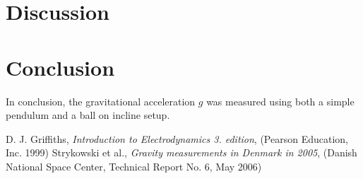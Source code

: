 \documentclass[a4paper,%
aps,%
prl,%
amsfonts,%
amssymb,%
amsmath,%
nobibnotes,%
twocolumn, %
twoside,%
balancelastpage,%
eqsecnum] %
{revtex4-1}
\begin{document}
\section{Discussion}

\section{Conclusion}

In conclusion, the gravitational acceleration $g$ was measured using both a
simple pendulum and a ball on incline setup.

\begin{thebibliography}{99}
 D. J. Griffiths, \emph{Introduction to Electrodynamics 3.
    edition}, (Pearson Education, Inc. 1999)
 Strykowski et al., \emph{Gravity measurements in Denmark
    in 2005}, (Danish National Space Center, Technical Report No. 6, May 2006)
\end{thebibliography}
\end{document}

